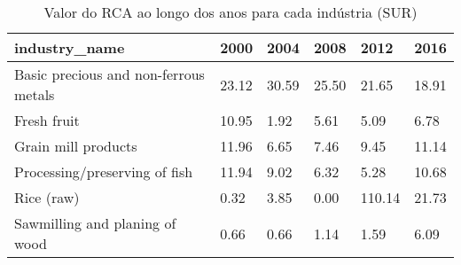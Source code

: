 \begin{table}
\centering
\caption{Valor do RCA ao longo dos anos para cada indústria (SUR)}
\begin{tabular}{p{6cm}p{1.5cm}p{1.5cm}p{1.5cm}p{1.5cm}p{1.5cm}}
\toprule
                        industry\_name &  2000 &  2004 &  2008 &   2012 &  2016 \\
\midrule
Basic precious and non-ferrous metals & 23.12 & 30.59 & 25.50 &  21.65 & 18.91 \\
                          Fresh fruit & 10.95 &  1.92 &  5.61 &   5.09 &  6.78 \\
                  Grain mill products & 11.96 &  6.65 &  7.46 &   9.45 & 11.14 \\
        Processing/preserving of fish & 11.94 &  9.02 &  6.32 &   5.28 & 10.68 \\
                           Rice (raw) &  0.32 &  3.85 &  0.00 & 110.14 & 21.73 \\
       Sawmilling and planing of wood &  0.66 &  0.66 &  1.14 &   1.59 &  6.09 \\
\bottomrule
\end{tabular}
\end{table}
